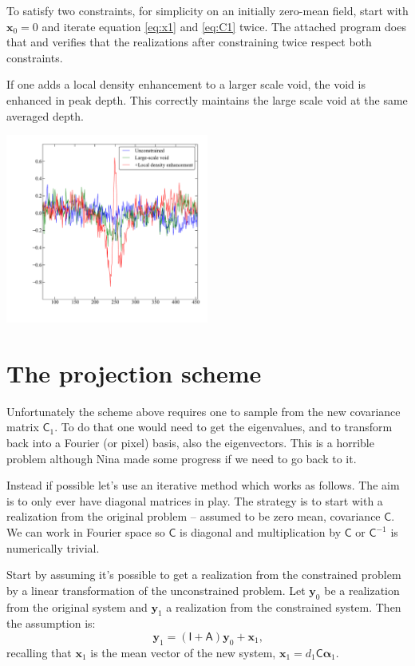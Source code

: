 \documentclass[11pt,a4paper,preprint]{aastex}
\newcommand{\bmath}[1]{\ensuremath{\bm{#1}}}
\renewcommand{\vec}[1]{\bmath{#1}}
\begin{document}
To satisfy two constraints, for simplicity on an initially zero-mean
field, start with $\vec{x}_0=0$ and iterate equation \eqref{eq:x1} and
\eqref{eq:C1} twice. The attached program does that and verifies that
the realizations after constraining twice respect both constraints.

If one adds a local density enhancement to a larger scale void, the
void is enhanced in peak depth. This correctly maintains the large scale void at
the same averaged depth. 

\begin{center}
\includegraphics[width=0.5\textwidth]{HR-demo.pdf}
\end{center}


\section{The projection scheme}

Unfortunately the scheme above requires one to sample from the new
covariance matrix $\mathsf{C}_1$. To do that one would need to get the
eigenvalues, and to transform back into a Fourier (or pixel) basis,
also the eigenvectors. This is a horrible problem although Nina made
some progress if we need to go back to it.

Instead if possible let's use an iterative method which works as
follows. The aim is to only ever have diagonal matrices in play. The
strategy is to start with a realization from the original problem --
assumed to be zero mean, covariance $\mathsf{C}$. We can work in
Fourier space so $\mathsf{C}$ is diagonal and multiplication by
$\mathsf{C}$ or $\mathsf{C}^{-1}$ is numerically trivial.

Start by assuming it's possible to get a realization from the
constrained problem by a linear transformation of the unconstrained
problem. Let $\vec{y}_0$ be a realization from the original system and
$\vec{y}_1$ a realization from the constrained system. Then the
assumption is:
\begin{equation}
\vec{y}_1 = (\mathsf{I} + \mathsf{A}) \vec{y}_0 + \vec{x}_1\textrm{,}
\end{equation}
recalling that $\vec{x}_1$ is the mean vector of the new system,
$\vec{x}_1 = d_1 \mathsf{C} \vec{\alpha}_1$. 
\end{document}
